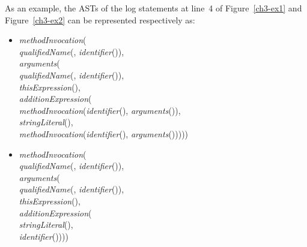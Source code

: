 As an example, the ASTs of the log statements at line~4 of Figure~\ref{ch3-ex1} and Figure~\ref{ch3-ex2} can be represented respectively as:
\begin{itemize} [leftmargin=0.7in]
\item \textit{methodInvocation}(\\
\hspace*{1em}\textit{qualifiedName}(, \textit{identifier}()),\\
\hspace*{1em}\textit{arguments}(\\
\hspace*{2em}\textit{qualifiedName}(, \mbox{\textit{identifier}()}),\\
\hspace*{2em}\textit{thisExpression}(),\\
\hspace*{2em}\textit{additionExpression}(\\
\hspace*{3em}\textit{methodInvocation}(\textit{identifier}(), \textit{arguments}()),\\
\hspace*{3em}\textit{stringLiteral}(),\\
\hspace*{3em}\textit{methodInvocation}(\textit{identifier}(), \textit{arguments}()))))
\item \textit{methodInvocation}(\\
\hspace*{1em}\textit{qualifiedName}(, \textit{identifier}()),\\
\hspace*{1em}\textit{arguments}(\\
\hspace*{2em}\textit{qualifiedName}(, \mbox{\textit{identifier}()}),\\
\hspace*{2em}\textit{thisExpression}(),\\
\hspace*{2em}\textit{additionExpression}(\\
\hspace*{3em}\textit{stringLiteral}(),\\
\hspace*{3em}\textit{identifier}())))
\end{itemize}

